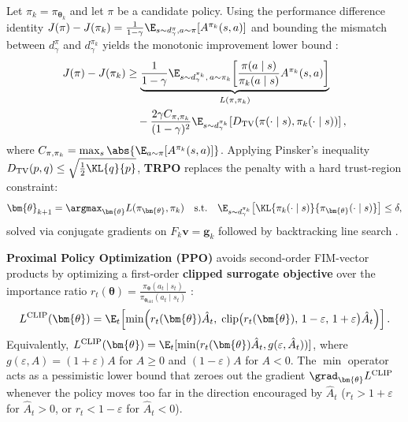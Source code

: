 \documentclass[../../../../master.tex]{subfiles}
\begin{document}
\begin{coremath}
Let $\pi_k = \pi_{\bm{\theta}_k}$ and let $\pi$ be a candidate policy. Using the performance difference identity $J(\pi) - J(\pi_k) = \frac{1}{1-\gamma}\E_{s \sim d^\pi_\gamma, a \sim \pi}[A^{\pi_k}(s, a)]$ and bounding the mismatch between $d^\pi_\gamma$ and $d^{\pi_k}_\gamma$ yields the monotonic improvement lower bound  :
\begin{align}
  J(\pi) - J(\pi_k) &\ge \underbrace{\frac{1}{1-\gamma} \E_{s \sim d^{\pi_k}_\gamma,\, a \sim \pi_k}\!\left[ \frac{\pi(a \mid s)}{\pi_k(a \mid s)} A^{\pi_k}(s, a) \right]}_{L(\pi, \pi_k)} \nonumber \\
  &\quad - \frac{2\gamma C_{\pi,\pi_k}}{(1-\gamma)^2} \E_{s \sim d^{\pi_k}_\gamma}\!\left[ D_{\mathrm{TV}}\!\left(\pi(\cdot \mid s), \pi_k(\cdot \mid s)\right) \right], \label{eq:pg:trpo_bound}
\end{align}
where $C_{\pi,\pi_k} = \max_s \abs{\E_{a \sim \pi}[A^{\pi_k}(s, a)]}$. Applying Pinsker's inequality $D_{\mathrm{TV}}(p, q) \le \sqrt{\frac{1}{2}\KL{q}{p}}$, \textbf{TRPO} replaces the penalty with a hard trust-region constraint:
\begin{equation}\label{eq:pg:trpo_opt}
  \bm{\theta}_{k+1} = \argmax_{\bm{\theta}} L(\pi_{\bm{\theta}}, \pi_k) \quad \text{s.t.} \quad \E_{s \sim d^{\pi_k}_\gamma}\!\left[\KL{\pi_k(\cdot \mid s)}{\pi_{\bm{\theta}}(\cdot \mid s)}\right] \le \delta,
\end{equation}
solved via conjugate gradients on $F_k \mathbf{v} = \mathbf{g}_k$ followed by backtracking line search .

\textbf{Proximal Policy Optimization (PPO)} avoids second-order FIM-vector products by optimizing a first-order \textbf{clipped surrogate objective} over the importance ratio $r_t(\bm{\theta}) = \frac{\pi_{\bm{\theta}}(a_t \mid s_t)}{\pi_{\bm{\theta}_{\mathrm{old}}}(a_t \mid s_t)}$  :
\begin{equation}\label{eq:pg:ppo_clip}
  L^{\mathrm{CLIP}}(\bm{\theta}) = \E_t\!\left[ \min\!\Big( r_t(\bm{\theta})\hat{A}_t,\; \mathrm{clip}\big(r_t(\bm{\theta}),\, 1-\varepsilon,\, 1+\varepsilon\big)\hat{A}_t \Big) \right].
\end{equation}
Equivalently, $L^{\mathrm{CLIP}}(\bm{\theta}) = \E_t[\min(r_t(\bm{\theta})\hat{A}_t, g(\varepsilon, \hat{A}_t))]$, where $g(\varepsilon, A) = (1+\varepsilon)A$ for $A \ge 0$ and $(1-\varepsilon)A$ for $A < 0$. The $\min$ operator acts as a pessimistic lower bound that zeroes out the gradient $\grad_{\bm{\theta}} L^{\mathrm{CLIP}}$ whenever the policy moves too far in the direction encouraged by $\hat{A}_t$ ($r_t > 1+\varepsilon$ for $\hat{A}_t > 0$, or $r_t < 1-\varepsilon$ for $\hat{A}_t < 0$).
\end{coremath}
\end{document}
